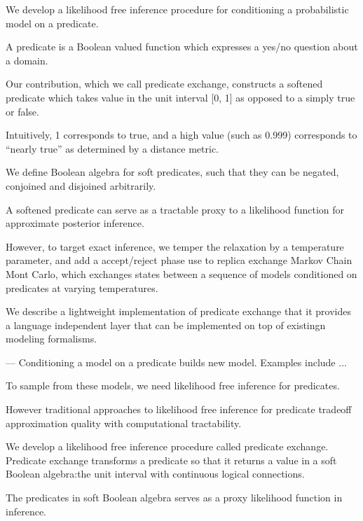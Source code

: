 We develop a likelihood free inference procedure for conditioning a probabilistic model on a predicate.

A predicate is a Boolean valued function which expresses a yes/no question about a domain.

Our contribution, which we call predicate exchange, 
constructs a softened predicate which takes value in the unit interval [0, 1] as opposed to a simply true or false. 

Intuitively, 1 corresponds to true, and a high value (such as 0.999) corresponds to ``nearly true'' as determined by a distance metric.

We define Boolean algebra for soft predicates,  such that they can be negated, conjoined and disjoined arbitrarily.

A softened predicate can serve as a tractable proxy to a likelihood function for approximate posterior inference.

However, to target exact inference, we temper the relaxation by a temperature parameter, and add a accept/reject phase use to replica exchange Markov Chain Mont Carlo, which exchanges states between a sequence of models conditioned on predicates at varying temperatures.

We describe a lightweight implementation of predicate exchange that it provides a language independent layer that can be implemented on top of existingn modeling formalisms.

---
Conditioning a model on a predicate builds new model. Examples
include ...

To sample from these models, we need likelihood free inference
for predicates. 

However traditional approaches to likelihood 
free inference for predicate tradeoff approximation quality
with computational tractability.

We develop a likelihood free inference procedure 
called predicate exchange. Predicate exchange 
transforms a predicate so that it returns 
a value in a soft Boolean algebra:the unit
interval with continuous logical connections.

The predicates in soft Boolean algebra serves as a proxy likelihood
function in inference.



% 